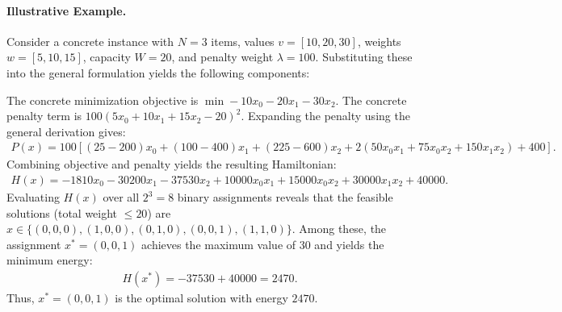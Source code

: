 \documentclass[12pt]{article}
\begin{document}
\paragraph{Illustrative Example.}
Consider a concrete instance with $N=3$ items, values $v = [10, 20, 30]$, weights $w = [5, 10, 15]$, capacity $W = 20$, and penalty weight $\lambda = 100$. Substituting these into the general formulation yields the following components:

The concrete minimization objective is $\min -10x_0 - 20x_1 - 30x_2$.
The concrete penalty term is $100(5x_0 + 10x_1 + 15x_2 - 20)^2$.
Expanding the penalty using the general derivation gives:
\begin{align}
    P(x) = 100 \left[ (25 - 200)x_0 + (100 - 400)x_1 + (225 - 600)x_2 + 2(50x_0x_1 + 75x_0x_2 + 150x_1x_2) + 400 \right].
\end{align}
Combining objective and penalty yields the resulting Hamiltonian:
\begin{align}
    H(x) = -1810 x_0 - 30200 x_1 - 37530 x_2 + 10000 x_0 x_1 + 15000 x_0 x_2 + 30000 x_1 x_2 + 40000.
\end{align}
Evaluating $H(x)$ over all $2^3 = 8$ binary assignments reveals that the feasible solutions (total weight $\le 20$) are $x \in \{(0,0,0), (1,0,0), (0,1,0), (0,0,1), (1,1,0)\}$. Among these, the assignment $x^* = (0,0,1)$ achieves the maximum value of $30$ and yields the minimum energy:
\begin{align}
    H(x^*) = -37530 + 40000 = 2470.
\end{align}
Thus, $x^* = (0,0,1)$ is the optimal solution with energy $2470$.
\end{document}
